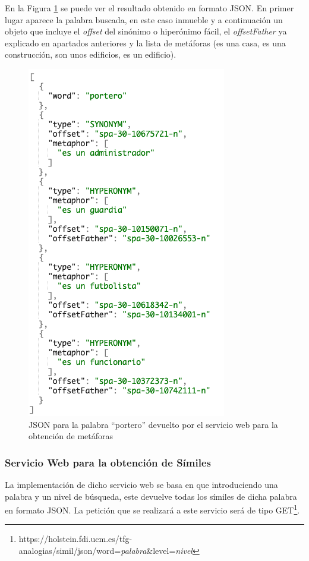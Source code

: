 En la Figura \ref{fig:peticionMetaphor} se puede ver el resultado obtenido en formato JSON. En primer lugar aparece la palabra buscada, en este caso inmueble y a continuación un objeto que incluye el \textit{offset} del sinónimo o hiperónimo fácil, el \textit{offsetFather}  ya explicado en apartados anteriores y la lista de metáforas (es una casa, es una construcción, son unos edificios, es un edificio). 

\begin{figure}[!h]
	\includegraphics[width=.6\textwidth]{Imagenes/Bitmap/Capitulo4/JSON-SW/peticionMetaphor.png}
	\centering
	\caption{JSON para la palabra ``portero'' devuelto por el servicio web para la obtención de metáforas}
	\label{fig:peticionMetaphor}
\end{figure}


\subsubsection{Servicio Web para la obtención de Símiles}
\label{cap:subsec:sw_simil}
La implementación de dicho servicio web se basa en que introduciendo una palabra y un nivel de búsqueda, este devuelve todas los símiles de dicha palabra en formato JSON. La petición que se realizará a este servicio será de tipo GET\footnote{https://holstein.fdi.ucm.es/tfg-analogias/simil/json/word=\textit{palabra}\&level=\textit{nivel}}.

